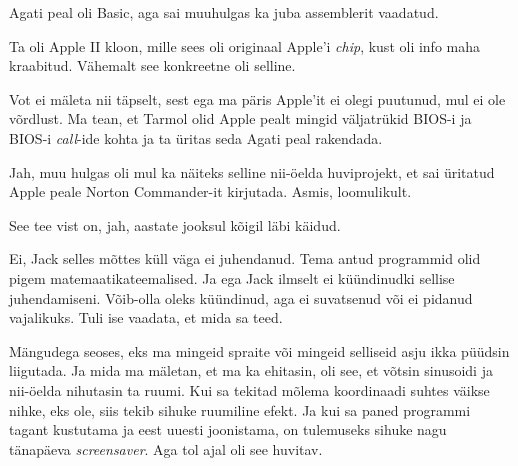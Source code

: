 Agati peal oli Basic, aga sai muuhulgas ka juba assemblerit 
vaadatud.


Ta oli Apple II kloon, mille sees  oli originaal 
Apple'i \emph{chip}, kust oli info maha kraabitud. Vähemalt see konkreetne oli 
selline.


Vot ei mäleta nii täpselt, sest ega ma päris Apple'it ei olegi puutunud, mul ei 
ole võrdlust. Ma tean, et Tarmol olid Apple pealt 
mingid väljatrükid BIOS-i ja BIOS-i \emph{call}-ide kohta ja ta üritas seda 
Agati peal rakendada.
                 

Jah, muu hulgas oli mul ka näiteks selline nii-öelda huviprojekt, et sai 
üritatud Apple peale Norton Commander-it kirjutada. 
Asmis, loomulikult.
                 

See tee vist on, jah, aastate jooksul kõigil läbi käidud. 

                 
Ei, Jack selles mõttes küll väga ei juhendanud. Tema antud 
programmid olid pigem  matemaatikateemalised. Ja ega Jack ilmselt ei 
küündinudki sellise juhendamiseni. Võib-olla oleks küündinud, aga ei suvatsenud 
või ei pidanud vajalikuks. Tuli ise vaadata, et mida sa teed. 

Mängudega seoses, eks ma mingeid spraite või mingeid selliseid asju ikka 
püüdsin liigutada. Ja mida ma mäletan,  et ma ka ehitasin, oli see, et võtsin 
sinusoidi ja nii-öelda nihutasin ta ruumi. Kui sa tekitad mõlema koordinaadi 
suhtes  väikse nihke, eks ole, siis tekib sihuke ruumiline efekt. Ja kui sa 
paned programmi tagant kustutama ja eest uuesti joonistama, on tulemuseks 
sihuke nagu tänapäeva \emph{screensaver}. Aga tol ajal oli see huvitav.
                 
